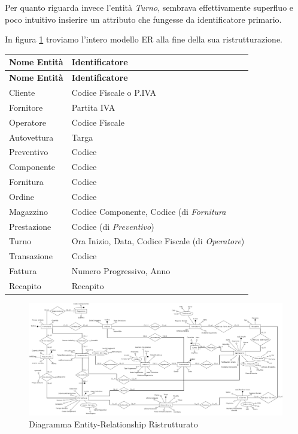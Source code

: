 		Per quanto riguarda invece l'entità \emph{Turno}, sembrava effettivamente superfluo e poco intuitivo insierire un attributo che fungesse da identificatore primario.

		In figura \ref{fig:schema_refactor} troviamo l'intero modello ER alla fine della sua ristrutturazione.
		
		\vspace{2ex}
		\begin{longtable}{| p{3cm} | p{9.4cm} |}
			\hline
			\textbf{Nome Entità} & \textbf{Identificatore} \\
			\hline
			\endfirsthead

			\hline
			\textbf{Nome Entità} & \textbf{Identificatore} \\
			\hline
			\endhead

			Cliente 		& Codice Fiscale o P.IVA 	\\ \hline
			Fornitore 		& Partita IVA 				\\ \hline
			Operatore 		& Codice Fiscale 			\\ \hline
			Autovettura  	& Targa						\\ \hline
			Preventivo 		& Codice					\\ \hline
			Componente 		& Codice					\\ \hline
			Fornitura 		& Codice					\\ \hline
			Ordine 			& Codice					\\ \hline
			Magazzino  		& Codice Componente, Codice (di \emph{Fornitura}			\\ \hline
			Prestazione 	& Codice (di \emph{Preventivo})								\\ \hline
			Turno			& Ora Inizio, Data, Codice Fiscale (di \emph{Operatore})	\\ \hline
			Transazione 	& Codice					\\ \hline
			Fattura         & Numero Progressivo, Anno 	\\ \hline
			Recapito 		& Recapito 					\\

			\hline			
		\end{longtable}
		\vspace{2ex}

		\begin{figure}
			\centering
			\includegraphics[width=22cm]{images/refactor/schema.png}
			\caption{Diagramma Entity-Relationship Ristrutturato}
			\label{fig:schema_refactor}
		\end{figure}

